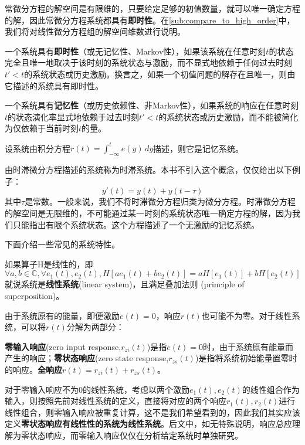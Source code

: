 常微分方程的解空间是有限维的，只要给定足够的初值数量，就可以唯一确定方程的解，因此常微分方程系统都具有\textbf{即时性}。在\ref{sub:compare_to_high_order}中，我们将对线性微分方程组的解空间维数进行说明。

\begin{definition}[即时性与记忆性]
一个系统具有\textbf{即时性}（或无记忆性、Markov性），如果该系统在任意时刻$t$的状态完全且唯一地取决于该时刻的系统状态与激励，而不显式地依赖于任何过去时刻$t'<t$的系统状态或历史激励。换言之，如果一个初值问题的解存在且唯一，则由它描述的系统具有即时性。

一个系统具有\textbf{记忆性}（或历史依赖性、非Markov性），如果系统的响应在任意时刻$t$的状态演化率显式地依赖于过去时刻$t'<t$的系统状态或历史激励，而不能被简化为仅依赖于当前时刻$t$的量。
\end{definition}

\begin{example}[积分方程]
    设系统由积分方程$r(t)=\int_{-\infty}^{t}e(y)\,dy$描述，则它是记忆系统。
\end{example}
\begin{example}[时滞系统]
    由时滞微分方程描述的系统称为时滞系统。本书不引入这个概念，仅仅给出以下例子：
    \[y'(t)=y(t)+y(t-\tau)\]
    其中$\tau$是常数。一般来说，我们不将时滞微分方程归类为微分方程。时滞微分方程的解空间是无限维的，不可能通过某一时刻的系统状态唯一确定方程的解，因为我们只能指出有限个系统状态。这个方程描述了一个无激励的记忆系统。
\end{example}

下面介绍一些常见的系统特性。

\begin{definition}[线性系统]
    如果算子H是线性的，即
\[\forall a,b\in\mathbb{C},\forall e_1(t),e_2(t),H[ae_1(t)+be_2(t)]=aH[e_1(t)]+bH[e_2(t)]\]
就说系统是\textbf{线性系统}(linear system)，且满足叠加法则 (principle of superposition)。
\end{definition}

由于系统原有的能量，即便激励$e(t)=0$，响应$r(t)$也可能不为零。对于线性系统，可以将$r(t)$分解为两部分：
\begin{definition}[零输入响应与零状态响应]
   \textbf{零输入响应}(zero input response,$r_{zi}(t)$)是指$e(t)=0$时，由于系统原有能量而产生的响应；\textbf{零状态响应}(zero state response,$r_{zs}(t)$)是指将系统初始能量置零时的响应。\textbf{全响应}$r(t)=r_{zi}(t)+r_{zs}(t)$。
\end{definition}
对于零输入响应不为0的线性系统，考虑以两个激励$e_1(t),e_2(t)$的线性组合作为输入，则按照先前对线性系统的定义，直接将对应的两个响应$r_1(t),r_2(t)$进行线性组合，则零输入响应被重复计算，这不是我们希望看到的，因此我们其实应该定义\textbf{零状态响应有线性性的系统为线性系统}。后文中，如无特殊说明，响应总应理解为零状态响应，而零输入响应仅仅在分析给定系统时单独研究。

